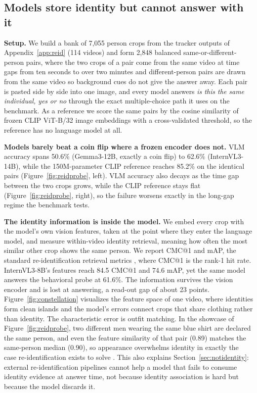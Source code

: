 \documentclass{article}
\begin{document}
\subsection{Models store identity but cannot answer with it}
\label{sec:p1}
\textbf{Setup.} We build a bank of 7{,}055 person crops from the tracker outputs of Appendix~\ref{app:reid} (114 videos) and form 2{,}848 balanced same-or-different-person pairs, where the two crops of a pair come from the same video at time gaps from ten seconds to over two minutes and different-person pairs are drawn from the same video so background cues do not give the answer away. Each pair is pasted side by side into one image, and every model answers \emph{is this the same individual, yes or no} through the exact multiple-choice path it uses on the benchmark. As a reference we score the same pairs by the cosine similarity of frozen CLIP ViT-B/32 image embeddings \citep{clip} with a cross-validated threshold, so the reference has no language model at all.

\textbf{Models barely beat a coin flip where a frozen encoder does not.} VLM accuracy spans 50.6\% (Gemma3-12B, exactly a coin flip) to 62.6\% (InternVL3-14B), while the 150M-parameter CLIP reference reaches 85.2\% on the identical pairs (Figure~\ref{fig:reidprobe}, left). VLM accuracy also decays as the time gap between the two crops grows, while the CLIP reference stays flat (Figure~\ref{fig:reidprobe}, right), so the failure worsens exactly in the long-gap regime the benchmark tests.

\textbf{The identity information is inside the model.} We embed every crop with the model's own vision features, taken at the point where they enter the language model, and measure within-video identity retrieval, meaning how often the most similar other crop shows the same person. We report CMC@1 and mAP, the standard re-identification retrieval metrics \citep{market1501,reidsurvey}, where CMC@1 is the rank-1 hit rate. InternVL3-8B's features reach 84.5 CMC@1 and 74.6 mAP, yet the same model answers the behavioral probe at 61.6\%. The information survives the vision encoder and is lost at answering, a read-out gap of about 23 points. Figure~\ref{fig:constellation} visualizes the feature space of one video, where identities form clean islands and the model's errors connect crops that share clothing rather than identity. The characteristic error is outfit matching. In the showcase of Figure~\ref{fig:reidprobe}, two different men wearing the same blue shirt are declared the same person, and even the feature similarity of that pair (0.89) matches the same-person median (0.90), so appearance overwhelms identity in exactly the case re-identification exists to solve \citep{osnet,ltcc}. This also explains Section~\ref{sec:notidentity}: external re-identification pipelines cannot help a model that fails to consume identity evidence at answer time, not because identity association is hard but because the model discards it.
\end{document}
